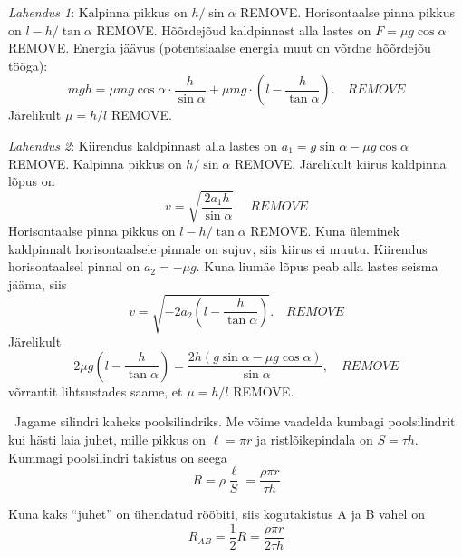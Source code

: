 \documentclass[10pt]{article}
\newcommand{\p}[1]{REMOVE}
\begin{document}

\solu
\emph{Lahendus 1}:
Kalpinna pikkus on $h/\sin \alpha$ \p{0,5}. Horisontaalse pinna pikkus on $l-h/\tan \alpha$ \p{0,5}.
Hõõrdejõud kaldpinnast alla lastes on $F=\mu g \cos \alpha$ \p2. Energia jäävus (potentsiaalse energia muut on võrdne hõõrdejõu tööga):
\begin{equation*}
mgh = \mu mg \cos \alpha \cdot \frac{h}{\sin \alpha} + \mu mg \cdot \left(l- \frac{h}{\tan \alpha}\right). \quad \p4
\end{equation*}
Järelikult $\mu=h/l$ \p1.

\emph{Lahendus 2}:
Kiirendus kaldpinnast alla lastes on $a_1=g \sin \alpha - \mu g \cos \alpha$ \p2. Kalpinna pikkus on $h/\sin \alpha$ \p{0,5}. Järelikult kiirus kaldpinna lõpus on
\begin{equation*}
  v=\sqrt{\frac{2a_1h}{\sin \alpha}}. \quad \p{1,5}
\end{equation*}
Horisontaalse pinna pikkus on $l-h/\tan \alpha$ \p{0,5}. Kuna üleminek kaldpinnalt horisontaalsele pinnale on sujuv, siis kiirus ei muutu. Kiirendus horisontaalsel pinnal on $a_2= - \mu g $. Kuna liumäe lõpus peab alla lastes seisma jääma, siis
\begin{equation*}
  v=\sqrt{-2a_2\left(l-\frac{h}{\tan \alpha}\right)}.\quad \p{1,5}
\end{equation*}
Järelikult
\begin{equation*}
  2\mu g\left(l-\frac{h}{\tan \alpha}\right)=\frac{2h(g\sin \alpha - \mu g \cos \alpha)}{\sin \alpha}, \quad \p1
\end{equation*}
võrrantit lihtsustades saame, et $\mu=h/l$ \p1.
\probend
\bigskip


\solu
\
Jagame silindri kaheks poolsilindriks. Me võime vaadelda kumbagi poolsilindrit kui hästi laia juhet, mille pikkus on $\ell = \pi r$ ja ristlõikepindala on $S = \tau h$. Kummagi poolsilindri takistus on seega
\begin{equation*}
    R = \rho \frac{\ell}{S} = \frac{\rho \pi r}{\tau h}
\end{equation*}

Kuna kaks ``juhet'' on ühendatud rööbiti, siis kogutakistus A ja B vahel on
\begin{equation*}
    R_{AB} = \frac{1}{2}R = \frac{\rho \pi r}{2\tau h}
\end{equation*}
\probend
\bigskip
\end{document}
